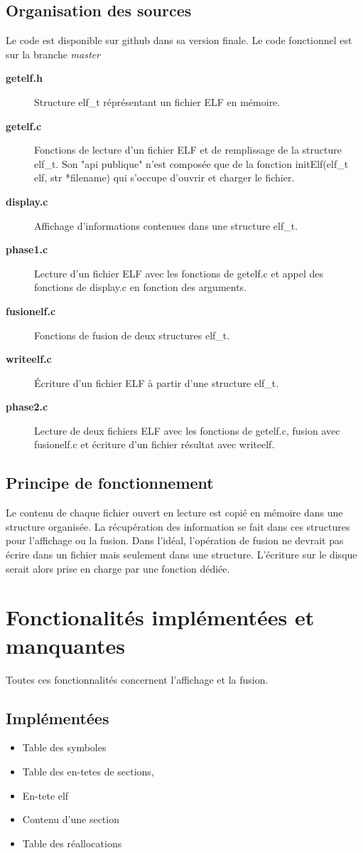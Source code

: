 \documentclass[10pt,oneside]{article}   %
\begin{document}
	\subsection{Organisation des sources}
	Le code est disponible sur github\cite{github} dans sa version finale. Le code fonctionnel est sur la branche \it{master}
	\begin{description}
		\item [\bf{getelf.h}] Structure elf\_t réprésentant un fichier ELF en mémoire.
		\item [\bf{getelf.c}] Fonctions de lecture d'un fichier ELF et de remplissage de la structure elf\_t. Son "api publique" n'est composée que de la fonction initElf(elf\_t elf, str *filename) qui s'occupe d'ouvrir et charger le fichier.
		\item [\bf{display.c}] Affichage d'informations contenues dans une structure elf\_t.
		\item [\bf{phase1.c}] Lecture d'un fichier ELF avec les fonctions de getelf.c et appel des fonctions de display.c en fonction des arguments.
		\item [\bf{fusionelf.c}] Fonctions de fusion de deux structures elf\_t.
		\item [\bf{writeelf.c}] Écriture d'un fichier ELF à partir d'une structure elf\_t.
		\item [\bf{phase2.c}] Lecture de deux fichiers ELF avec les fonctions de getelf.c, fusion avec fusionelf.c et écriture d'un fichier résultat avec writeelf.
	\end{description}

	\subsection{Principe de fonctionnement}
	Le contenu de chaque fichier ouvert en lecture est copié en mémoire dans une structure organisée. La récupération des information se fait dans ces structures pour l'affichage ou la fusion. Dans l'idéal, l'opération de fusion ne devrait pas écrire dans un fichier mais seulement dans une structure. L'écriture sur le disque serait alors prise en charge par une fonction dédiée.


\section{Fonctionalités implémentées et manquantes}
	Toutes ces fonctionnalités concernent l'affichage et la fusion.
	\subsection{Implémentées}
		\begin{itemize}
			\item Table des symboles
			\item Table des en-tetes de sections,
			\item En-tete elf
			\item Contenu d'une section
			\item Table des réallocations
		\end{itemize}
\end{document}
